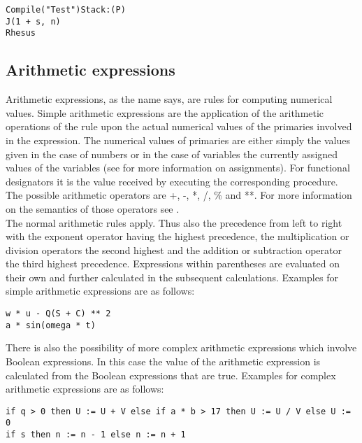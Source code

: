 \documentclass{article}
\begin{document}
\begin{lstlisting}[language={[60]algol}]
Compile("Test")Stack:(P)
J(1 + s, n)
Rhesus
\end{lstlisting}

\subsection{Arithmetic expressions} \label{arithexp}
Arithmetic expressions, as the name says, are rules for computing numerical values. Simple arithmetic expressions are the application of the arithmetic operations of the rule upon the actual numerical values of the primaries involved in the expression. The numerical values of primaries are either simply the values given in the case of numbers or in the case of variables the currently assigned values of the variables (see  for more information on assignments). For functional designators it is the value received by executing the corresponding procedure.\\
The possible arithmetic operators are +, -, *, /, \% and  **. For more information on the semantics of those operators see .\\
 The normal arithmetic rules apply. Thus also the precedence from left to right with the exponent operator having the highest precedence, the multiplication or division operators the second highest and the addition or subtraction operator the third highest precedence. Expressions within parentheses are evaluated on their own and further calculated in the subsequent calculations. Examples for simple arithmetic expressions are as follows:\\

\begin{lstlisting}[language={[60]algol}]
w * u - Q(S + C) ** 2
a * sin(omega * t)
\end{lstlisting}

There is also the possibility of more complex arithmetic expressions which involve Boolean expressions. In this case the value of the arithmetic expression is calculated from the Boolean expressions that are true. Examples for complex arithmetic expressions are as follows:\\

\begin{lstlisting}[language={[60]algol}]
if q > 0 then U := U + V else if a * b > 17 then U := U / V else U := 0
if s then n := n - 1 else n := n + 1
\end{lstlisting}
\end{document}

